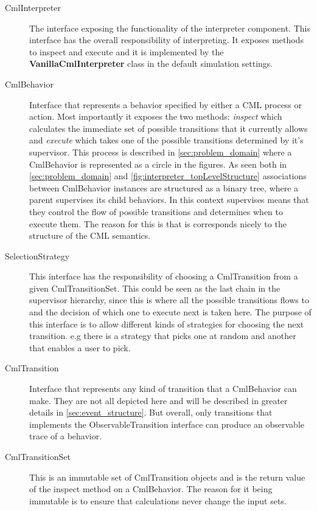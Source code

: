 \documentclass[a4paper, 10pt]{include/compassreport}   %
\begin{document}
\begin{description}
\item[CmlInterpreter] The interface exposing the functionality of the
  interpreter component. This interface has the overall responsibility
  of interpreting. It exposes methods to inspect and execute and it is
  implemented by the \textbf{VanillaCmlInterpreter} class in the default
  simulation settings.

\item[CmlBehavior] Interface that represents a behavior specified by
  either a CML process or action. Most importantly it exposes the two
  methods: \emph{inspect} which calculates the immediate set of possible
  transitions that it currently allows and \emph{execute} which takes
  one of the possible transitions determined by it's supervisor. This
  process is described in \autoref{sec:problem_domain} where a
  CmlBehavior is represented as a circle in the figures. As seen both in
  \autoref{sec:problem_domain} and
  \autoref{fig:interpreter_topLevelStructure} associations between
  CmlBehavior instances are structured as a binary tree, where a parent
  supervises its child behaviors. In this context supervises means that
  they control the flow of possible transitions and determines when to
  execute them. The reason for this is that is corresponds nicely to
  the structure of the CML semantics.

\item[SelectionStrategy] This interface has the responsibility of
  choosing a CmlTransition from a given CmlTransitionSet. This could be
  seen as the last chain in the supervisor hierarchy, since this is
  where all the possible transitions flows to and the decision of which
  one to execute next is taken here. The purpose of this interface is to
  allow different kinds of strategies for choosing the next
  transition. e.g there is a strategy that picks one at random
  and another that enables a user to pick.

\item[CmlTransition] Interface that represents any kind of transition
  that a CmlBehavior can make. They are not all depicted here and will
  be described in greater details in \autoref{sec:event_structure}. But
  overall, only transitions that implements the ObservableTransition
  interface can produce an observable trace of a behavior.

\item[CmlTransitionSet] This is an immutable set of CmlTransition
  objects and is the return value of the inspect method on a
  CmlBehavior. The reason for it being immutable is to ensure that
  calculations never change the input sets.

\end{description}
\end{document}
